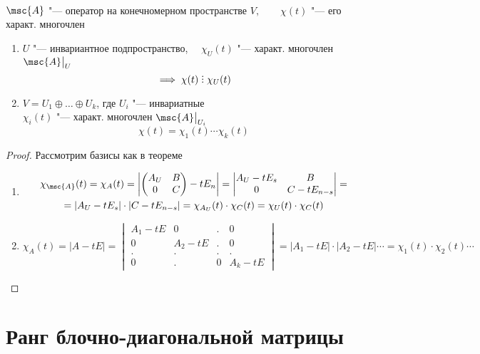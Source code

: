 \begin{implication}
    \hfill \\
	$ \msc{A} $ "--- оператор на конечномерном пространстве $ V, \qquad \chi(t) $ "--- его характ. многочлен
	\begin{enumerate}
		\item $ U $ "--- инвариантное подпространство, $ \quad \chi_U(t) $ "--- характ. многочлен $ \msc{A}\clamp{U} $
		$$ \implies \chi(t) \divby \chi_U(t) $$
		\item $ V = U_1 \oplus \dots \oplus U_k $, где $ U_i $ "--- инвариатные \\
		$ \chi_i(t) $ "--- характ. многочлен $ \msc{A}\clamp{U_i} $
		$$ \chi(t) = \chi_1(t) \cdots \chi_k(t) $$
	\end{enumerate}
\end{implication}

\begin{proof}
	Рассмотрим базисы как в теореме
	\begin{enumerate}
		\item
		\begin{multline*}
			\chi_{\msc{A}}(t) = \chi_A(t) = \left|
			\begin{pmatrix}
				A_U & B \\
				0 & C
			\end{pmatrix} - t E_n \right| =
			\begin{vmatrix}
				A_U - t E_s & B \\
				0 & C - t E_{n - s}
			\end{vmatrix} = \\
			= |A_U - t E_s | \cdot | C - t E_{n -s} | = \chi_{A_U}(t) \cdot \chi_C(t) = \chi_U(t) \cdot \chi_C(t)
		\end{multline*}
		\item $ \chi_A(t) = |A - tE| =
		\begin{vmatrix}
			A_1 - tE & 0 & . & 0 \\
			0 & A_2 - tE & . & 0 \\
			. & . & . & . \\
			0 & . & 0 & A_k - tE
		\end{vmatrix} = |A_1 - tE| \cdot |A_2 - tE| \cdots = \chi_1(t) \cdot \chi_2(t) \cdots $
	\end{enumerate}
\end{proof}

\section{Ранг блочно-диагональной матрицы}

